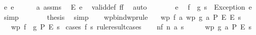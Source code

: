 \begin{isabellebody}
\ {\isacharparenleft}{\kern0pt}e\ e{\isacharparenright}{\kern0pt}\isanewline
\ \ \ \ \isamarkupfalse%
\ a\ assms{\isacharparenleft}{\kern0pt}{}{\isacharparenright}{\kern0pt}\ \isamarkupfalse%
\ {\isachardoublequoteopen}E\ e{\isachardoublequoteclose}\ \isamarkupfalse%
\ valid{\isacharunderscore}{\kern0pt}def{\isacharbrackleft}{\kern0pt}\ {\isacharquery}{\kern0pt}f{\isacharequal}{\kern0pt}f{\isacharbrackright}{\kern0pt}\ \isamarkupfalse%
\ auto\isanewline
\ \ \ \ \isamarkupfalse%
\ \isamarkupfalse%
\ e\ \isamarkupfalse%
\ {\isachardoublequoteopen}{\isacharparenleft}{\kern0pt}f\ {\isasymbind}\ g{\isacharparenright}{\kern0pt}\ s\ {\isacharequal}{\kern0pt}\ Exception\ e{\isachardoublequoteclose}\ \isamarkupfalse%
\ simp\isanewline
\ \ \ \ \isamarkupfalse%
\ \isamarkupfalse%
\ {\isacharquery}{\kern0pt}thesis\ \isamarkupfalse%
\ simp\isanewline
\ \ \isamarkupfalse%
\isanewline
{}\isamarkupfalse%
%
\endisatagproof
{\isafoldproof}%
%
\isadelimproof
\isanewline
%
\endisadelimproof
\isanewline
{}\isamarkupfalse%
\ wpbind{\isacharbrackleft}{\kern0pt}wprule{\isacharbrackright}{\kern0pt}{\isacharcolon}{\kern0pt}\isanewline
\ \ \ {\isachardoublequoteopen}wp\ f\ {\isacharparenleft}{\kern0pt}{\isasymlambda}a{\isachardot}{\kern0pt}\ {\isacharparenleft}{\kern0pt}wp\ {\isacharparenleft}{\kern0pt}g\ a{\isacharparenright}{\kern0pt}\ P\ E{\isacharparenright}{\kern0pt}{\isacharparenright}{\kern0pt}\ E\ s{\isachardoublequoteclose}\isanewline
\ \ \ {\isachardoublequoteopen}wp\ {\isacharparenleft}{\kern0pt}f\ {\isasymbind}\ g{\isacharparenright}{\kern0pt}\ P\ E\ s{\isachardoublequoteclose}\isanewline
%
\isadelimproof
%
\endisadelimproof
%
\isatagproof
{}\isamarkupfalse%
\ {\isacharparenleft}{\kern0pt}cases\ {\isachardoublequoteopen}f\ s{\isachardoublequoteclose}\ rule{\isacharcolon}{\kern0pt}result{\isacharunderscore}{\kern0pt}cases{\isacharparenright}{\kern0pt}\isanewline
\ \ \isamarkupfalse%
\ nf{\isacharcolon}{\kern0pt}\ {\isacharparenleft}{\kern0pt}n\ a\ s{\isacharprime}{\kern0pt}{\isacharparenright}{\kern0pt}\isanewline
\ \ \isamarkupfalse%
\ \isamarkupfalse%
\ {\isacharasterisk}{\kern0pt}{\isacharasterisk}{\kern0pt}{\isacharcolon}{\kern0pt}{\isachardoublequoteopen}wp\ {\isacharparenleft}{\kern0pt}g\ a{\isacharparenright}{\kern0pt}\ P\ E\ s{\isacharprime}{\kern0pt}{\isachardoublequoteclose}\ \isamarkupfalse%

\end{isabellebody}
